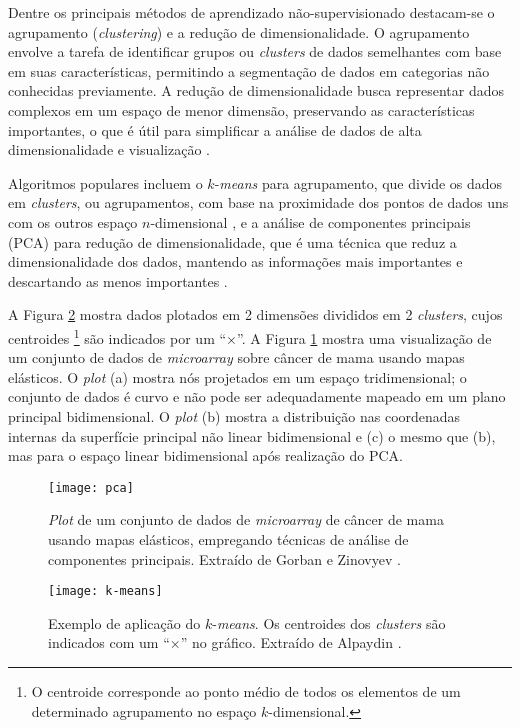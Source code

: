 \documentclass[
	12pt,				%
	openright,			%
	oneside,			%
	a4paper,			%
	tccpreliminar,			%
	]{ABNT-DC-UEL}
\begin{document}
Dentre os principais métodos de aprendizado não-supervisionado destacam-se o agrupamento (\textit{clustering}) e a redução de dimensionalidade. O agrupamento envolve a tarefa de identificar grupos ou \textit{clusters} de dados semelhantes com base em suas características, permitindo a segmentação de dados em categorias não conhecidas previamente. A redução de dimensionalidade busca representar dados complexos em um espaço de menor dimensão, preservando as características importantes, o que é útil para simplificar a análise de dados de alta dimensionalidade e visualização \cite{usama:19}. 

Algoritmos populares incluem o $k$-\textit{means} para agrupamento, que divide os dados em \textit{clusters}, ou agrupamentos, com base na proximidade dos pontos de dados uns com os outros espaço $n$-dimensional \cite{alpaydin:20, mohammed:16}, e a análise de componentes principais (PCA) para redução de dimensionalidade, que é uma técnica que reduz a dimensionalidade dos dados, mantendo as informações mais importantes e descartando as menos importantes \cite{gorban:10}. 

A Figura \ref{fig:k-means} mostra dados plotados em 2 dimensões divididos em 2 \textit{clusters}, cujos centroides \footnote{O centroide corresponde ao ponto médio de todos os elementos de um determinado agrupamento no espaço $k$-dimensional.} são indicados por um ``$\times$''. A Figura \ref{fig:pca} mostra uma visualização de um conjunto de dados de \textit{microarray} sobre câncer de mama usando mapas elásticos. O \textit{plot} (a) mostra nós projetados em um espaço tridimensional; o conjunto de dados é curvo e não pode ser adequadamente mapeado em um plano principal bidimensional. O \textit{plot} (b) mostra a distribuição nas coordenadas internas da superfície principal não linear bidimensional e (c) o mesmo que (b), mas para o espaço linear bidimensional após realização do PCA.

\begin{figure}[hbt]
    \centering
    \texttt{[image: pca]}
    \caption{\textit{Plot} de um conjunto de dados de \textit{microarray} de câncer de mama usando mapas elásticos, empregando técnicas de análise de componentes principais. Extraído de Gorban e Zinovyev \cite{gorban:10}.}
    \label{fig:pca}
\end{figure}

\begin{figure}[hbt]
    \centering
    \texttt{[image: k-means]}
    \caption{Exemplo de aplicação do $k$-\textit{means}. Os centroides dos \textit{clusters} são indicados com um ``$\times$'' no gráfico. Extraído de Alpaydin \cite{alpaydin:20}.}
    \label{fig:k-means}
\end{figure}
\end{document}

